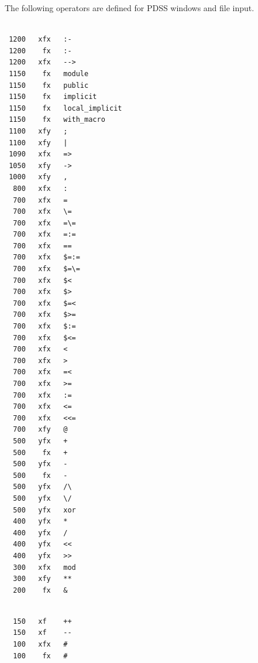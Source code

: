 The following operators are defined for PDSS windows and file input.
\begin{center}
\begin{minipage}[t]{70mm}
\begin{verbatim}

 1200   xfx   :-
 1200    fx   :-
 1200   xfx   -->
 1150    fx   module
 1150    fx   public
 1150    fx   implicit
 1150    fx   local_implicit
 1150    fx   with_macro
 1100   xfy   ;
 1100   xfy   |
 1090   xfx   =>
 1050   xfy   ->
 1000   xfy   ,
  800   xfx   :
  700   xfx   =
  700   xfx   \=
  700   xfx   =\=
  700   xfx   =:=
  700   xfx   ==
  700   xfx   $=:=
  700   xfx   $=\=
  700   xfx   $<
  700   xfx   $>
  700   xfx   $=<
  700   xfx   $>=
  700   xfx   $:=
  700   xfx   $<=
  700   xfx   <
  700   xfx   >
  700   xfx   =<
  700   xfx   >=
  700   xfx   :=
  700   xfx   <=
  700   xfx   <<=
  700   xfy   @
  500   yfx   +
  500    fx   +
  500   yfx   -
  500    fx   -
  500   yfx   /\
  500   yfx   \/
  500   yfx   xor
  400   yfx   *
  400   yfx   /
  400   yfx   <<
  400   yfx   >>
  300   xfx   mod
  300   xfy   **
  200    fx   &

\end{verbatim}
\end{minipage}
\begin{minipage}[t]{70mm}
\begin{verbatim}

  150   xf    ++
  150   xf    --
  100   xfx   #
  100    fx   #

\end{verbatim}
\end{minipage}
\end{center}


